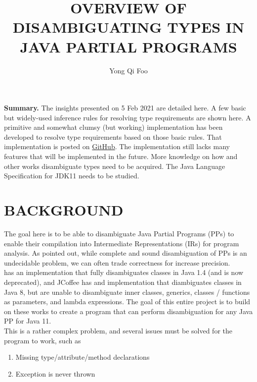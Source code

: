 \documentclass{article}
\begin{document}


\title{OVERVIEW OF DISAMBIGUATING TYPES IN JAVA PARTIAL PROGRAMS}

\author{Yong Qi Foo}

\maketitle            

\noindent \textbf{Summary.} The insights presented on 5 Feb 2021 are detailed here.
A few basic but widely-used inference rules for resolving type requirements are shown here.
A primitive and somewhat clumsy (but
working) implementation has been developed to resolve type requirements
based on those basic rules. That implementation is posted on
\href{https://github.com/yonggqiii/javacpp.git}{GitHub}.
The implementation still lacks many features
that will be implemented in the future.
More knowledge on how \cite{dagenais08} and other works disambiguate types need
to be acquired. The Java Language Specification for JDK11 needs to be studied.


%
\section{BACKGROUND}
%
The goal here is to be able to disambiguate Java Partial Programs (PPs) to enable their
compilation into Intermediate Representations (IRs) for program analysis. As \cite{dagenais08}
pointed out, while complete and sound disambiguation of PPs is an undecidable problem, we
can often trade correctness for increase precision.\\

\cite{dagenais08} has an implementation that fully disambiguates classes in Java 1.4 (and is
now deprecated),
and JCoffee \cite{jcoffee20} has and implementation that diambiguates classes in Java 8, but are unable
to disambiguate inner classes, generics, classes / functions as parameters, and lambda expressions.
The goal of this entire project is to build on these works to create a program that can 
perform disambiguation for any Java PP for Java 11.\\

This is a rather complex problem, and several issues must be solved for the program to work,
such as
\begin{enumerate}
    \item Missing type/attribute/method declarations
    \item Exception is never thrown
\end{enumerate}
\end{document}
